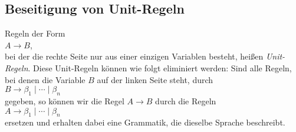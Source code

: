 \subsection{Beseitigung von Unit-Regeln}
Regeln der Form
\\[0.2cm]
\hspace*{1.3cm}
$A \rightarrow B$,
\\[0.2cm]
bei der die rechte Seite nur aus einer einzigen Variablen besteht, hei{\ss}en \emph{Unit-Regeln}.
Diese Unit-Regeln k\"onnen wie folgt eliminiert werden:  Sind alle Regeln, bei denen die
Variable $B$ auf der linken Seite steht, durch
\\[0.2cm]
\hspace*{1.3cm}
$B \rightarrow \beta_1 \mid \cdots \mid \beta_n$ 
\\[0.2cm]
gegeben, so k\"onnen wir die Regel $A \rightarrow B$ durch die Regeln
\\[0.2cm]
\hspace*{1.3cm}
$A \rightarrow \beta_1 \mid \cdots \mid \beta_n$ 
\\[0.2cm]
ersetzen und erhalten dabei eine Grammatik, die dieselbe Sprache beschreibt.

